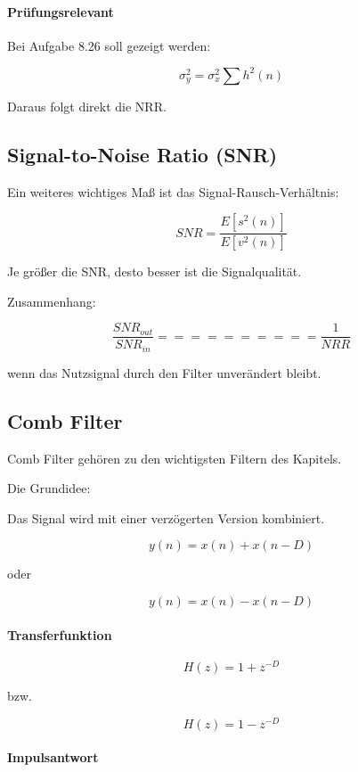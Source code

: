 \paragraph{Prüfungsrelevant}

Bei Aufgabe 8.26 soll gezeigt werden:

\[
\sigma_y^2=
\sigma_x^2
\sum h^2(n)
\]

Daraus folgt direkt die NRR.

\subsection{Signal-to-Noise Ratio (SNR)}

Ein weiteres wichtiges Maß ist das Signal-Rausch-Verhältnis:

\[
SNR=
\frac{E[s^2(n)]}
{E[v^2(n)]}
\]

Je größer die SNR, desto besser ist die Signalqualität.

Zusammenhang:

\[
\frac{SNR_{out}}
{SNR_{in}}
==========

\frac{1}{NRR}
\]

wenn das Nutzsignal durch den Filter unverändert bleibt.

\subsection{Comb Filter}

Comb Filter gehören zu den wichtigsten Filtern des Kapitels.

Die Grundidee:

Das Signal wird mit einer verzögerten Version kombiniert.

\[
y(n)=x(n)+x(n-D)
\]

oder

\[
y(n)=x(n)-x(n-D)
\]

\paragraph{Transferfunktion}

\[
H(z)=1+z^{-D}
\]

bzw.

\[
H(z)=1-z^{-D}
\]

\paragraph{Impulsantwort}

